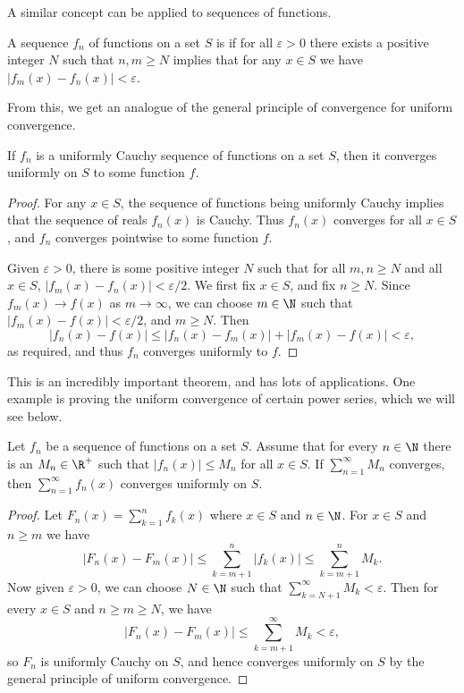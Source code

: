 A similar concept can be applied to sequences of functions.

\begin{definition}
    A sequence $f_n$ of functions on a set $S$ is  if for all $\varepsilon > 0$ there exists a positive integer $N$ such that $n, m \geq N$ implies that for any $x \in S$ we have $|f_m(x) - f_n(x)| < \varepsilon$.
\end{definition}

From this, we get an analogue of the general principle of convergence for uniform convergence.

\begin{theorem}
    If $f_n$ is a uniformly Cauchy sequence of functions on a set $S$, then it converges uniformly on $S$ to some function $f$.
\end{theorem}
\begin{proof}
    For any $x \in S$, the sequence of functions being uniformly Cauchy implies that the sequence of reals $f_n(x)$ is Cauchy. Thus $f_n(x)$ converges for all $x \in S$, and $f_n$ converges pointwise to some function $f$. 

    Given $\varepsilon > 0$, there is some positive integer $N$ such that for all $m, n \geq N$ and all $x \in S$, $|f_m(x) - f_n(x)| < \varepsilon/2$. We first fix $x \in S$, and fix $n \geq N$. Since $f_m(x) \rightarrow f(x)$ as $m \rightarrow \infty$, we can choose $m \in \N$ such that $|f_m(x) - f(x)| < \varepsilon/2$, and $m \geq N$. Then
    $$
    |f_n(x) - f(x)| \leq |f_n(x) - f_m(x)| + |f_m(x) - f(x)| < \varepsilon,
    $$
    as required, and thus $f_n$ converges uniformly to $f$.
\end{proof}


This is an incredibly important theorem, and has lots of applications. One example is proving the uniform convergence of certain power series, which we will see below.

\begin{theorem}
    Let $f_n$ be a sequence of functions on a set $S$. Assume that for every $n \in \N$ there is an $M_n \in \R^+$ such that $|f_n(x)| \leq M_n$ for all $x \in S$. If $\sum_{n = 1}^{\infty} M_n$ converges, then $\sum_{n = 1}^{\infty} f_n(x)$ converges uniformly on $S$.
\end{theorem}
\begin{proof}
    Let $F_n(x) = \sum_{k = 1}^n f_k(x)$ where $x \in S$ and $n \in \N$.
    For $x \in S$ and $n \geq m$ we have
    $$
    |F_n(x) - F_m(x)| \leq \sum_{k = m + 1}^n |f_k(x)| \leq \sum_{k = m + 1}^n M_k.
    $$
    Now given $\varepsilon>0$, we can choose $N \in \N$ such that $\sum_{k = N + 1}^{\infty} M_k < \varepsilon$. Then for every $x \in S$ and $n \geq m \geq N$, we have
    $$
    |F_n(x) - F_m(x)| \leq \sum_{k = m + 1}^{\infty} M_k < \varepsilon,
    $$
    so $F_n$ is uniformly Cauchy on $S$, and hence converges uniformly on $S$ by the general principle of uniform convergence.
\end{proof}

